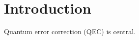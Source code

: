 \documentclass{article}
\begin{document}
\begin{abstract}We study QEC on new lattices.\end{abstract}
\section{Introduction}Quantum error correction (QEC) is central.
\end{document}
